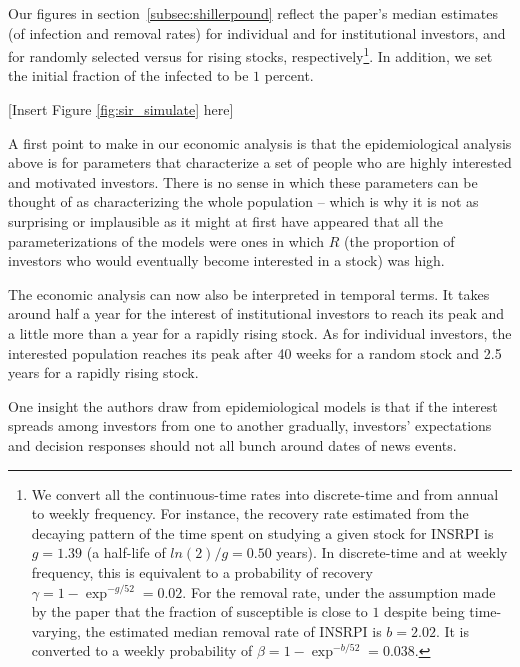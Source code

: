 Our figures in section~\ref{subsec:shillerpound} reflect the paper's median estimates (of infection and removal rates) for individual and for institutional investors, and for randomly selected versus for rising stocks, respectively\footnote{We convert all the continuous-time rates into discrete-time and from annual to weekly frequency. For instance, the recovery rate estimated from the decaying pattern of the time spent on studying a given stock for INSRPI is $g=1.39$ (a half-life of $ln(2)/g=0.50$ years). In discrete-time and at weekly frequency, this is equivalent to a probability of recovery $\gamma = 1-\exp^{-g/52} =0.02$. For the removal rate, under the assumption made by the paper that the fraction of susceptible is close to $1$ despite being time-varying, the estimated median removal rate of INSRPI is $b = 2.02$. It is converted to a weekly probability of $\beta = 1-\exp^{-b/52}=0.038$.}.  In addition, we set the initial fraction of the infected to be $1$ percent.

[Insert Figure \ref{fig:sir_simulate} here]

A first point to make in our economic analysis is that the epidemiological analysis above is for parameters that characterize a set of people who are highly interested and motivated investors.  There is no sense in which these parameters can be thought of as characterizing the whole population -- which is why it is not as surprising or implausible as it might at first have appeared that all the parameterizations of the models were ones in which $R$ (the proportion of investors who would eventually become interested in a stock) was high.

The economic analysis can now also be interpreted in temporal terms.  It takes around half a year for the interest of institutional investors to reach its peak and a little more than a year for a rapidly rising stock. As for individual investors, the interested population reaches its peak after 40 weeks for a random stock and 2.5 years for a rapidly rising stock.


One insight the authors draw from epidemiological models is that if the interest spreads among investors from one to another gradually, investors' expectations and decision responses should not all bunch around dates of news events.

